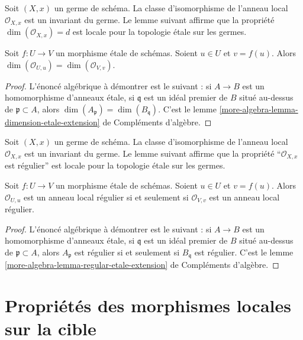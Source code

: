 \noindent
Soit $(X, x)$ un germe de schéma. La classe d'isomorphisme de l'anneau local
$\mathcal{O}_{X, x}$ est un invariant du germe. Le lemme suivant affirme que
la propriété $\dim(\mathcal{O}_{X, x}) = d$ est locale pour la topologie
\'etale sur les germes.

\begin{lemma}
\label{lemma-dimension-local-ring-local}
Soit $f : U \to V$ un morphisme \'etale de schémas. Soient $u \in U$ et
$v = f(u)$. Alors
$\dim(\mathcal{O}_{U, u}) = \dim(\mathcal{O}_{V, v})$.
\end{lemma}

\begin{proof}
L'énoncé algébrique à démontrer est le suivant : si $A \to B$ est un
homomorphisme d'anneaux \'etale, si $\mathfrak q$ est un idéal premier de
$B$ situé au-dessus de $\mathfrak p \subset A$, alors
$\dim(A_{\mathfrak p}) = \dim(B_{\mathfrak q})$. C'est le lemme
\ref{more-algebra-lemma-dimension-etale-extension} de Compléments d'algèbre.
\end{proof}

\noindent
Soit $(X, x)$ un germe de schéma. La classe d'isomorphisme de l'anneau local
$\mathcal{O}_{X, x}$ est un invariant du germe. Le lemme suivant affirme que
la propriété ``$\mathcal{O}_{X, x}$ est régulier'' est locale pour la
topologie \'etale sur les germes.

\begin{lemma}
\label{lemma-regular-local-ring-local}
Soit $f : U \to V$ un morphisme \'etale de schémas. Soient $u \in U$ et
$v = f(u)$. Alors $\mathcal{O}_{U, u}$ est un anneau local régulier si et
seulement si $\mathcal{O}_{V, v}$ est un anneau local régulier.
\end{lemma}

\begin{proof}
L'énoncé algébrique à démontrer est le suivant : si $A \to B$ est un
homomorphisme d'anneaux \'etale, si $\mathfrak q$ est un idéal premier de
$B$ situé au-dessus de $\mathfrak p \subset A$, alors $A_{\mathfrak p}$ est
régulier si et seulement si $B_{\mathfrak q}$ est régulier. C'est le lemme
\ref{more-algebra-lemma-regular-etale-extension} de Compléments d'algèbre.
\end{proof}







\section{Propriétés des morphismes locales sur la cible}
\label{section-descending-properties-morphisms}

